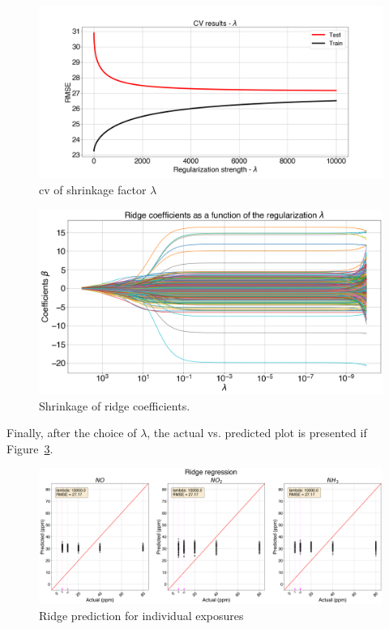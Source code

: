 \begin{figure}[h]
	\centering
	\includegraphics[width=1\textwidth]{../figures/ridge-cv-exposures.png}
	\caption{\acrshort{cv} of shrinkage factor $\lambda$}
	\label{fig:ridge-cv-exposures}
\end{figure}

\begin{figure}[h]
	\centering
	\includegraphics[width=1\textwidth]{../figures/ridge-coefs.png}
	\caption{Shrinkage of ridge coefficients.}
	\label{fig:ridge-shrink}
\end{figure}

Finally, after the choice of $\lambda$, the actual vs. predicted plot is presented if Figure~\ref{fig:ridge-exposures}.

\begin{figure}[h]
	\centering
	\includegraphics[width=1\textwidth]{../figures/ridge-exposures.png}
	\caption{Ridge prediction for individual exposures}
	\label{fig:ridge-exposures}
\end{figure}


